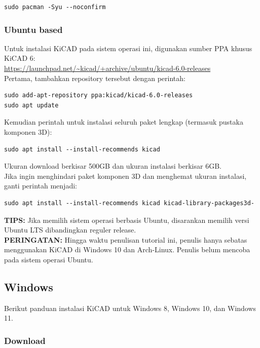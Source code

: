 \documentclass[12pt]{book}
\begin{document}
	\begin{lstlisting}
sudo pacman -Syu --noconfirm
	\end{lstlisting}

	\subsubsection{Ubuntu based}

	Untuk instalasi KiCAD pada sistem operasi ini, digunakan sumber PPA khusus KiCAD 6:\\
	\url{https://launchpad.net/~kicad/+archive/ubuntu/kicad-6.0-releases} \\

	Pertama, tambahkan repository tersebut dengan perintah:
	\begin{lstlisting}
sudo add-apt-repository ppa:kicad/kicad-6.0-releases
sudo apt update
	\end{lstlisting}

	Kemudian perintah untuk instalasi seluruh paket lengkap (termasuk pustaka komponen 3D):
	\begin{lstlisting}
sudo apt install --install-recommends kicad
	\end{lstlisting}
	Ukuran download berkisar 500GB dan ukuran instalasi berkisar 6GB.\\

	Jika ingin menghindari paket komponen 3D dan menghemat ukuran instalasi, ganti perintah menjadi:

	\begin{lstlisting}
sudo apt install --install-recommends kicad kicad-library-packages3d-
	\end{lstlisting}

	\textbf{TIPS:} Jika memilih sistem operasi berbasis Ubuntu, disarankan memilih versi Ubuntu LTS dibandingkan
	reguler release.\\

	\textbf{PERINGATAN:} Hingga waktu penulisan tutorial ini, penulis hanya sebatas menggunakan
	KiCAD di Windows 10 dan Arch-Linux.
	Penulis belum mencoba pada sistem operasi Ubuntu.

	\newpage
	\subsection{Windows}

	Berikut panduan instalasi KiCAD untuk Windows 8, Windows 10, dan Windows 11.

	\subsubsection{Download}
\end{document}
